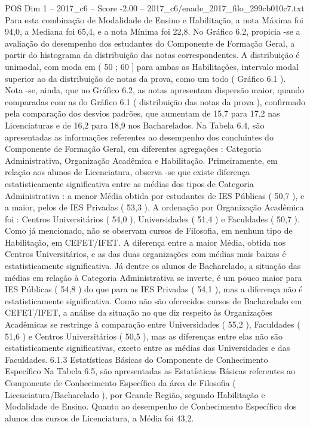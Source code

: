 \begin{textsample}{POS Dim 1 – 2017\_c6 – Score -2.00 – 2017\_c6/enade\_2017\_filo\_299cb010c7.txt}
Para esta combinação de Modalidade de Ensino e Habilitação, a nota Máxima foi 94,0, a Mediana foi 65,4, e a nota Mínima foi 22,8.
No Gráfico 6.2, propicia -se a avaliação do desempenho dos estudantes do Componente de Formação Geral, a partir do histograma da distribuição das notas correspondentes.
A distribuição é unimodal, com moda em ( 50 ; 60 ] para ambas as Habilitações, intervalo modal superior ao da distribuição de notas da prova, como um todo ( Gráfico 6.1 ).
Nota -se, ainda, que no Gráfico 6.2, as notas apresentam dispersão maior, quando comparadas com as do Gráfico 6.1 ( distribuição das notas da prova ), confirmado pela comparação dos desvios padrões, que aumentam de 15,7 para 17,2 nas Licenciaturas e de 16,2 para 18,9 nos Bacharelados.
Na Tabela 6.4, são apresentadas as informações referentes ao desempenho dos concluintes do Componente de Formação Geral, em diferentes agregações : Categoria Administrativa, Organização Acadêmica e Habilitação.
Primeiramente, em relação aos alunos de Licenciatura, observa -se que existe diferença estatisticamente significativa entre as médias dos tipos de Categoria Administrativa : a menor Média obtida por estudantes de IES Públicas ( 50,7 ), e a maior, pelos de IES Privadas ( 53,3 ).
A ordenação por Organização Acadêmica foi : Centros Universitários ( 54,0 ), Universidades ( 51,4 ) e Faculdades ( 50,7 ).
Como já mencionado, não se observam cursos de Filosofia, em nenhum tipo de Habilitação, em CEFET/IFET.
A diferença entre a maior Média, obtida nos Centros Universitários, e as das duas organizações com médias mais baixas é estatisticamente significativa.
Já dentre os alunos de Bacharelado, a situação das médias em relação à Categoria Administrativa se inverte, é um pouco maior para IES Públicas ( 54,8 ) do que para as IES Privadas ( 54,1 ), mas a diferença não é estatisticamente significativa.
Como não são oferecidos cursos de Bacharelado em CEFET/IFET, a análise da situação no que diz respeito às Organizações Acadêmicas se restringe à comparação entre Universidades ( 55,2 ), Faculdades ( 51,6 ) e Centros Universitários ( 50,5 ), mas as diferenças entre elas não são estatisticamente significativas, exceto entre as médias das Universidades e das Faculdades. 6.1.3 Estatísticas Básicas do Componente de Conhecimento Específico Na Tabela 6.5, são apresentadas as Estatísticas Básicas referentes ao Componente de Conhecimento Específico da área de Filosofia ( Licenciatura/Bacharelado ), por Grande Região, segundo Habilitação e Modalidade de Ensino.
Quanto ao desempenho de Conhecimento Específico dos alunos dos cursos de Licenciatura, a Média foi 43,2.

\end{textsample}
